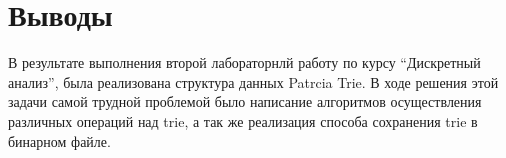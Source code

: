 \section{Выводы}
В результате выполнения второй лабораторнлй работу по курсу \enquote{Дискретный анализ}, была реализована структура данных Patrcia Trie.
В ходе решения этой задачи самой трудной проблемой было написание алгоритмов осуществления различных операций над trie, 
а так же реализация способа сохранения trie в бинарном файле.
\pagebreak
